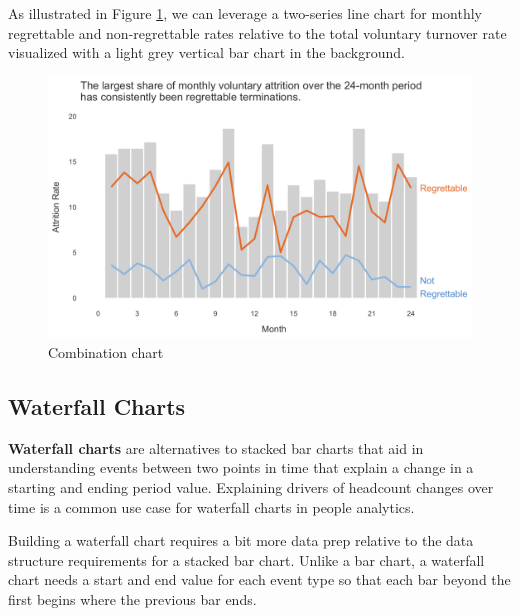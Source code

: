 \documentclass[
]{book}
\begin{document}
As illustrated in Figure \ref{fig:combo-chart}, we can leverage a two-series line chart for monthly regrettable and non-regrettable rates relative to the total voluntary turnover rate visualized with a light grey vertical bar chart in the background.

\begin{figure}

{\centering \includegraphics[width=1\linewidth]{graphics/combo_chart} 

}

\caption{Combination chart}\label{fig:combo-chart}
\end{figure}

\hypertarget{waterfall-charts}{%
\subsection{Waterfall Charts}\label{waterfall-charts}}

\textbf{Waterfall charts} are alternatives to stacked bar charts that aid in understanding events between two points in time that explain a change in a starting and ending period value. Explaining drivers of headcount changes over time is a common use case for waterfall charts in people analytics.

Building a waterfall chart requires a bit more data prep relative to the data structure requirements for a stacked bar chart. Unlike a bar chart, a waterfall chart needs a start and end value for each event type so that each bar beyond the first begins where the previous bar ends.
\end{document}
